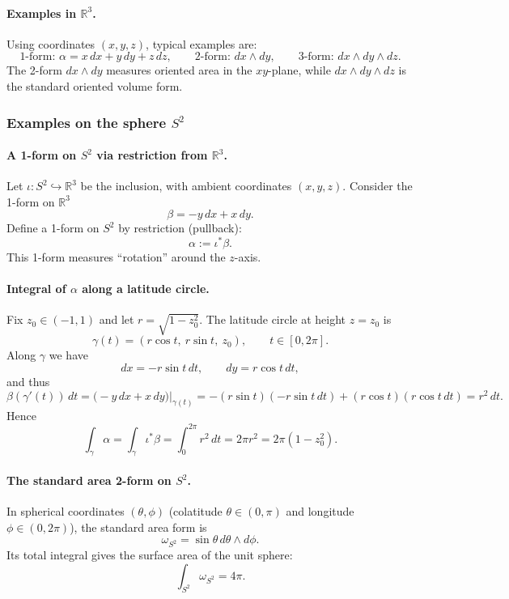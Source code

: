 \documentclass[12pt,a4paper]{article}
\theoremstyle{plain}
\theoremstyle{definition}      %
\begin{document}
\paragraph{Examples in $\mathbb{R}^3$.}
Using coordinates $(x,y,z)$, typical examples are:
\[
\text{1-form: } \alpha = x\,dx + y\,dy + z\,dz,\qquad
\text{2-form: } dx\wedge dy,\qquad
\text{3-form: } dx\wedge dy\wedge dz.
\]
The 2-form $dx\wedge dy$ measures oriented area in the $xy$-plane, while $dx\wedge dy\wedge dz$
is the standard oriented volume form.

\subsubsection*{Examples on the sphere $S^2$}

\paragraph{A 1-form on $S^2$ via restriction from $\mathbb{R}^3$.}
Let $\iota:S^2\hookrightarrow \mathbb{R}^3$ be the inclusion, with ambient coordinates $(x,y,z)$.
Consider the 1-form on $\mathbb{R}^3$
\[
\beta = -y\,dx + x\,dy.
\]
Define a 1-form on $S^2$ by restriction (pullback):
\[
\alpha := \iota^*\beta.
\]
This 1-form measures ``rotation'' around the $z$-axis.

\paragraph{Integral of $\alpha$ along a latitude circle.}
Fix $z_0\in(-1,1)$ and let $r=\sqrt{1-z_0^2}$. The latitude circle at height $z=z_0$ is
\[
\gamma(t)=(r\cos t,\ r\sin t,\ z_0),\qquad t\in[0,2\pi].
\]
Along $\gamma$ we have
\[
dx = -r\sin t\,dt,\qquad dy = r\cos t\,dt,
\]
and thus
\[
\beta(\gamma'(t))\,dt = \big(-y\,dx + x\,dy\big)\Big|_{\gamma(t)}
= -(r\sin t)(-r\sin t\,dt) + (r\cos t)(r\cos t\,dt)=r^2\,dt.
\]
Hence
\[
\int_\gamma \alpha = \int_\gamma \iota^*\beta = \int_0^{2\pi} r^2\,dt
= 2\pi r^2 = 2\pi(1-z_0^2).
\]

\paragraph{The standard area 2-form on $S^2$.}
In spherical coordinates $(\theta,\phi)$ (colatitude $\theta\in(0,\pi)$ and longitude $\phi\in(0,2\pi)$),
the standard area form is
\[
\omega_{S^2} = \sin\theta\, d\theta\wedge d\phi.
\]
Its total integral gives the surface area of the unit sphere:
\[
\int_{S^2}\omega_{S^2} = 4\pi.
\]
\end{document}
